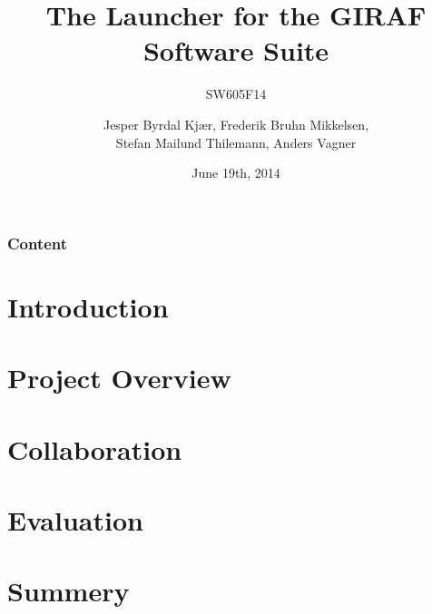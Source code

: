 \documentclass{beamer}
\title[The Launcher for the GIRAF Software Suite]{The Launcher for the GIRAF Software Suite}
\subtitle{SW605F14}
\author[SW605F14]{Jesper Byrdal Kj\ae r, Frederik Bruhn Mikkelsen, \\Stefan Mailund Thilemann, Anders Vagner}
\institute[Aalborg University]
{
  Department of Computer Science\\
  Aalborg University}
\date[CFP 2003]{June 19th, 2014}
\begin{document}
\begin{frame}
  \titlepage
\end{frame}

\begin{frame}
    \frametitle{Content}
    \tableofcontents[sectionstyle=show/show,subsectionstyle=hide/hide/hide]
\end{frame}

\section{Introduction}


\section{Project Overview}


\section{Collaboration}


\section{Evaluation}


\section{Summery}

\end{document}

